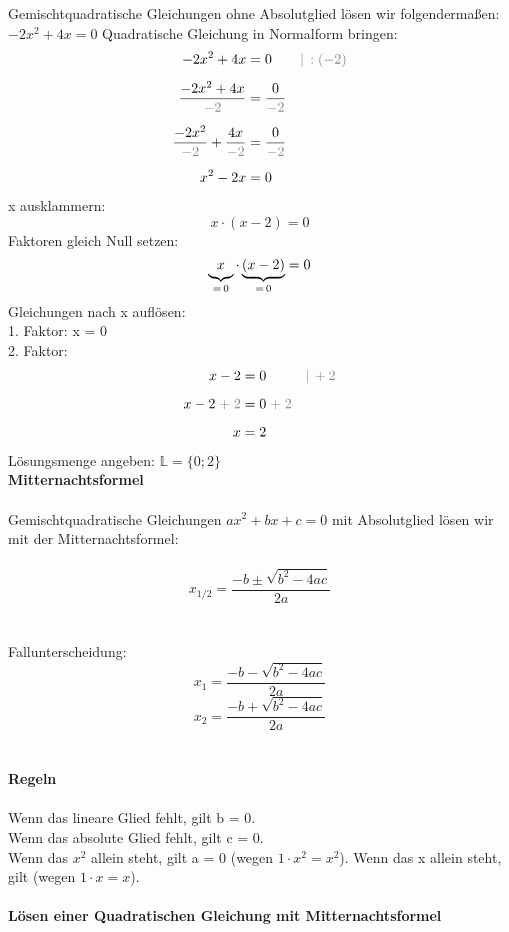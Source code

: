\documentclass[10pt,landscape]{article}
\begin{document}
\begin{multicols}{3}
    Gemischtquadratische Gleichungen ohne Absolutglied lösen wir folgendermaßen: \\
    $-2x^2 + 4x = 0$ Quadratische Gleichung in Normalform bringen: \\
    \begin{align*} -2x^2 + 4x &= 0 &&{\color{gray}|\, :(-2)} \\[5px] \frac{-2x^2 + 4x}{\color{gray}-2} &= \frac{0}{\color{gray}-2} \\[5px] \frac{-2x^2}{\color{gray}-2} + \frac{4x}{\color{gray}-2} &= \frac{0}{\color{gray}-2} \\[5px] x^2 - 2x &= 0 \end{align*}
    x ausklammern: \\
    \[x \cdot (x - 2) = 0\]
    Faktoren gleich Null setzen:\\
    \[\underbrace{x\vphantom{()}}_{=\,0} \cdot \underbrace{(x - 2)}_{=\,0} = 0\]
    Gleichungen nach x auflösen: \\
    1. Faktor: x = 0 \\
    2. Faktor:
    \begin{align*} x - 2 &= 0 &&{\color{gray}|\, +2} \\[5px] x - 2 {\color{gray}\;+\;2} &= 0 {\color{gray}\;+\;2} \\[5px] x &= 2 \end{align*}
    Lösungsmenge angeben:  $    \mathbb{L} = \{0; 2\}$ \\
    \textbf{Mitternachtsformel}\\~\\
    Gemischtquadratische Gleichungen $ax^2 + bx + c = 0$ mit Absolutglied lösen wir mit der Mitternachtsformel:\\~\\
    \[x_{1/2} = \frac{-b \pm \sqrt{b^2 - 4ac}}{2a}\]\\~\\
    Fallunterscheidung:
    \[x_{1} = \dfrac{-b - \sqrt{b^2 - 4ac}}{2a}\]
    \[x_{2} = \dfrac{-b + \sqrt{b^2 - 4ac}}{2a}\]\\~\\
    \textbf{Regeln}\\~\\
    Wenn das lineare Glied fehlt, gilt b = 0. \\
    Wenn das absolute Glied fehlt, gilt c = 0. \\
    Wenn das $x^2$ allein steht, gilt a = 0 (wegen $1 \cdot x^2 = x^2$).
    Wenn das x allein steht, gilt (wegen $1 \cdot x = x$).\\~\\
    \textbf{Lösen einer Quadratischen Gleichung mit Mitternachtsformel}\\~\\


\end{multicols}
\end{document}
